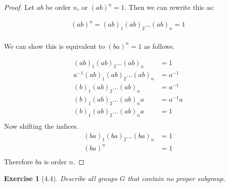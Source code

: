 \documentclass[12pt,leqno]{article}
\numberwithin{equation}{section}
\newtheorem*{exer}{Exercise}
\theoremstyle{definition}
\begin{document}
\begin{proof}[Proof]
    Let $ab$ be order $n$, or $(ab)^n = 1$. Then we can rewrite this as:
    
    \begin{align*}
        (ab)^n = (ab)_1 (ab)_2 \dots (ab)_n = 1 \\
    \end{align*}

    We can show this is equivalent to $(ba)^n = 1$ as follows.

    \begin{align*}
        (ab)_1 (ab)_2 \dots (ab)_n &= 1 \\
        a^{-1}(ab)_1 (ab)_2 \dots (ab)_n &= a^{-1}   \\
        (b)_1 (ab)_2 \dots (ab)_n &= a^{-1}  \\
        (b)_1 (ab)_2 \dots (ab)_n a &= a^{-1} a  \\
        (b)_1 (ab)_2 \dots (ab)_n a &= 1 \\
    \end{align*}
    Now shifting the indices.
    \begin{align*}
        (ba)_1 (ba)_2 \dots (ba)_n &= 1 \\
        (ba)^n &= 1  \\
    \end{align*}
    Therefore $ba$ is order $n$.
        
\end{proof}

\begin{exer}[4.4]Describe all groups $G$ that contain no proper subgroup.

\end{exer}
\end{document}
